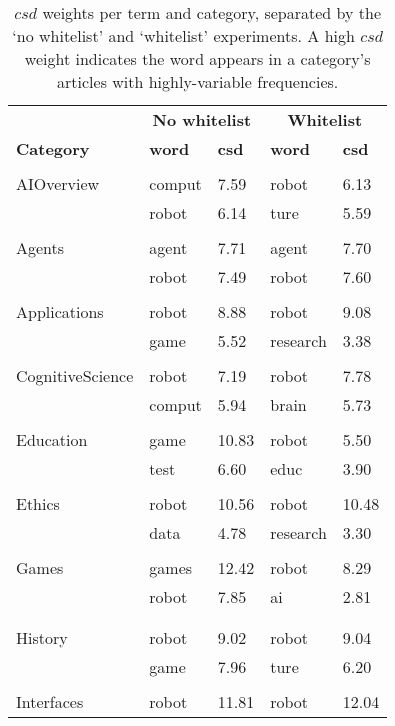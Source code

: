 \documentclass{article}
\begin{document}
  \begin{center}
  \begin{longtable}{lllll}

    & \multicolumn{2}{c}{\textbf{No whitelist}} &
      \multicolumn{2}{c}{\textbf{Whitelist}} \\
    \textbf{Category} & {\textbf{word}} & {\textbf{csd}} &
    \textbf{word} & \textbf{csd}\\
    \endhead
    \caption{$csd$ weights per term and category, separated by the `no
whitelist' and `whitelist' experiments. A high $csd$ weight indicates the word
appears in a category's articles with highly-variable frequencies.}
    \endlastfoot
    \label{table:csd}\\
    AIOverview & comput & 7.59 & robot & 6.13\\
    & robot & 6.14 & ture & 5.59\\
    &  &  &  & \\
    Agents & agent & 7.71 & agent & 7.70\\
    & robot & 7.49 & robot & 7.60\\
    &  &  &  & \\
    Applications & robot & 8.88 & robot & 9.08\\
    & game & 5.52 & research & 3.38\\
    &  &  &  & \\
    CognitiveScience & robot & 7.19 & robot & 7.78\\
    & comput & 5.94 & brain & 5.73\\
    &  &  &  & \\
    Education & game & 10.83 & robot & 5.50\\
    & test & 6.60 & educ & 3.90\\
    &  &  &  & \\
    Ethics & robot & 10.56 & robot & 10.48\\
    & data & 4.78 & research & 3.30\\
    &  &  &  & \\
    Games & games & 12.42 & robot & 8.29\\
    & robot & 7.85 & ai & 2.81\\
    &  &  &  & \\
    &  &  &  & \\
    History & robot & 9.02 & robot & 9.04\\
    & game & 7.96 & ture & 6.20\\
    &  &  &  & \\
    Interfaces & robot & 11.81 & robot & 12.04\\

\end{longtable}
\end{center}
\end{document}
